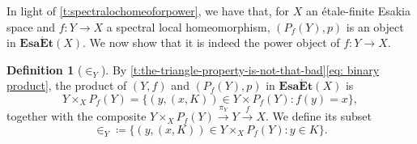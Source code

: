 \documentclass[12pt]{amsart}
\theoremstyle{plain}
\theoremstyle{definition}
\newtheorem{definition}[theorem]{Definition}
\newcommand{\cat}[1]{\mathbf{#1}}
\newcommand{\EsaEt}{\cat{Esa\acute{E}t}}
\begin{document}
In light of \cref{t:spectralochomeoforpower}, we have that, for $X$ an étale-finite Esakia space and $f\colon Y\to X$ a spectral local homeomorphism, $(P_{f}(Y),p)$ is an object in $\EsaEt(X)$. We now show that it is indeed the power object of $f\colon Y\to X$.

\begin{definition}[$\in_{Y}$] \label{def: definition of the product in power object}
    By \cref{t:the-triangle-property-is-not-that-bad}\eqref{eq: binary product}, the product of $(Y,f)$ and $(P_{f}(Y),p)$ in $\EsaEt(X)$ is
    \[
        Y\times_{X}P_{f}(Y) = \{(y,(x,K)) \in Y \times P_{f}(Y) : f(y)=x\},
    \]
    together with the composite $Y \times_X P_f(Y) \xrightarrow{\pi_Y} Y \xrightarrow{f} X$.
    We define its subset
    \[
        {\in_{Y}} \coloneqq \{(y,(x,K))\in Y\times_{X}P_{f}(Y) : y\in K\}.
    \]
\end{definition}
\end{document}
